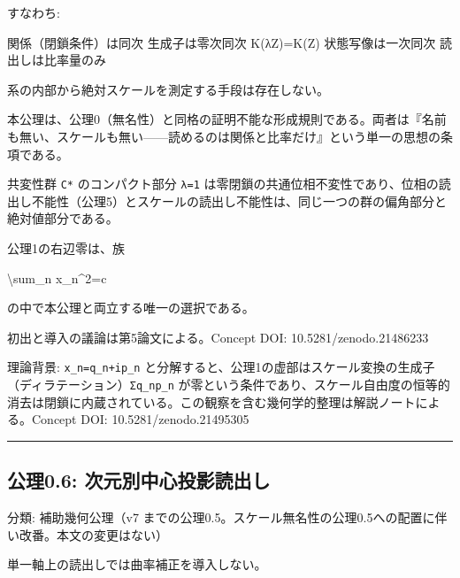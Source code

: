 \documentclass[
  a4paper,
]{ltjsarticle}
\newenvironment{Shaded}{}{}
\newcommand{\NormalTok}[1]{#1}
\begin{document}
すなわち:

\begin{Shaded}
\begin{Highlighting}[]
\NormalTok{関係（閉鎖条件）は同次}
\NormalTok{生成子は零次同次 K(λZ)=K(Z)}
\NormalTok{状態写像は一次同次}
\NormalTok{読出しは比率量のみ}
\end{Highlighting}
\end{Shaded}

系の内部から絶対スケールを測定する手段は存在しない。

本公理は、公理0（無名性）と同格の証明不能な形成規則である。両者は『名前も無い、スケールも無い------読めるのは関係と比率だけ』という単一の思想の条項である。

共変性群 \texttt{C*} のコンパクト部分 \texttt{\textbar{}λ\textbar{}=1}
は零閉鎖の共通位相不変性であり、位相の読出し不能性（公理5）とスケールの読出し不能性は、同じ一つの群の偏角部分と絶対値部分である。

公理1の右辺零は、族

\begin{Shaded}
\begin{Highlighting}[]
\NormalTok{\textbackslash{}sum\_n x\_n\^{}2=c}
\end{Highlighting}
\end{Shaded}

の中で本公理と両立する唯一の選択である。

初出と導入の議論は第5論文による。Concept DOI: 10.5281/zenodo.21486233

理論背景: \texttt{x\_n=q\_n+ip\_n}
と分解すると、公理1の虚部はスケール変換の生成子（ディラテーション）\texttt{Σq\_np\_n}
が零という条件であり、スケール自由度の恒等的消去は閉鎖に内蔵されている。この観察を含む幾何学的整理は解説ノートによる。Concept
DOI: 10.5281/zenodo.21495305

\begin{center}\rule{0.5\linewidth}{0.5pt}\end{center}

\subsection{公理0.6:
次元別中心投影読出し}\label{ux516cux74060.6-ux6b21ux5143ux5225ux4e2dux5fc3ux6295ux5f71ux8aadux51faux3057}

分類: 補助幾何公理（v7
までの公理0.5。スケール無名性の公理0.5への配置に伴い改番。本文の変更はない）

単一軸上の読出しでは曲率補正を導入しない。
\end{document}
